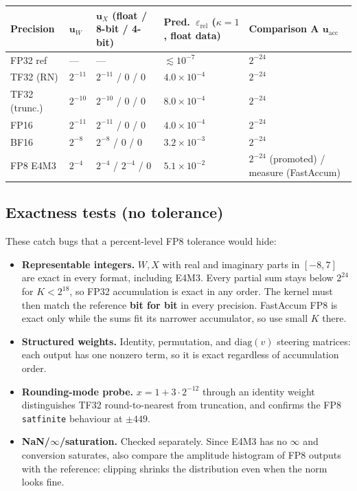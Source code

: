 \documentclass[10pt,letterpaper]{article}
\newcommand{\ur}{\mathbf{u}}
\begin{document}
\begin{center}
\small
\begin{tabular}{@{}l l l l l@{}}
  \toprule
  \textbf{Precision} & $\ur_W$ & $\ur_X$ (float / 8-bit / 4-bit) & \textbf{Pred.\ $\varepsilon_{\mathrm{rel}}$ ($\kappa{=}1$, float data)} & \textbf{Comparison A $\ur_{\mathrm{acc}}$} \\
  \midrule
  FP32 ref   & --- & --- & $\lesssim 10^{-7}$ & $2^{-24}$ \\
  TF32 (RN)  & $2^{-11}$ & $2^{-11}$ / 0 / 0 & $4.0\times10^{-4}$ & $2^{-24}$ \\
  TF32 (trunc.) & $2^{-10}$ & $2^{-10}$ / 0 / 0 & $8.0\times10^{-4}$ & $2^{-24}$ \\
  FP16       & $2^{-11}$ & $2^{-11}$ / 0 / 0 & $4.0\times10^{-4}$ & $2^{-24}$ \\
  BF16       & $2^{-8}$  & $2^{-8}$ / 0 / 0 & $3.2\times10^{-3}$ & $2^{-24}$ \\
  FP8 E4M3   & $2^{-4}$  & $2^{-4}$ / $2^{-4}$ / 0 & $5.1\times10^{-2}$ & $2^{-24}$ (promoted) / measure (FastAccum) \\
  \bottomrule
\end{tabular}
\end{center}

\subsection*{Exactness tests (no tolerance)}
These catch bugs that a percent-level FP8 tolerance would hide:
\begin{itemize}
  \item \textbf{Representable integers.} $W, X$ with real and imaginary parts in $[-8, 7]$ are exact in every format, including E4M3. Every partial sum stays below $2^{24}$ for $K < 2^{18}$, so FP32 accumulation is exact in any order. The kernel must then match the reference \textbf{bit for bit} in every precision. FastAccum FP8 is exact only while the sums fit its narrower accumulator, so use small $K$ there.
  \item \textbf{Structured weights.} Identity, permutation, and $\mathrm{diag}(v)$ steering matrices: each output has one nonzero term, so it is exact regardless of accumulation order.
  \item \textbf{Rounding-mode probe.} $x = 1 + 3\cdot2^{-12}$ through an identity weight distinguishes TF32 round-to-nearest from truncation, and confirms the FP8 \texttt{satfinite} behaviour at $\pm 449$.
  \item \textbf{NaN/$\infty$/saturation.} Checked separately. Since E4M3 has no $\infty$ and conversion saturates, also compare the amplitude histogram of FP8 outputs with the reference: clipping shrinks the distribution even when the norm looks fine.
\end{itemize}
\end{document}
